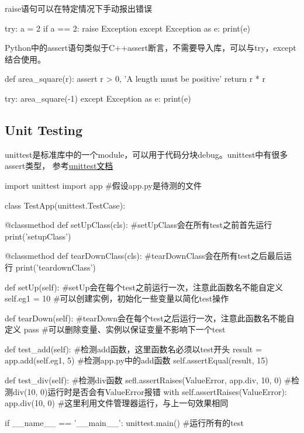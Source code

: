     raise语句可以在特定情况下手动报出错误
    \begin{codeblock}[language=python, caption={Raise an error}]
      try:
          a = 2
          if a == 2:
              raise Exception
      except Exception as e:
          print(e)
    \end{codeblock}

    Python中的assert语句类似于C++assert断言，不需要导入库，可以与try，except结合使用。
    \begin{codeblock}[language=python, caption={assert in python}]
      def area_square(r):
          assert r > 0, 'A length must be positive'
          return r * r

      try:
          area_square(-1)
      except Exception as e:
          print(e)
    \end{codeblock}

  \subsection{Unit Testing}
    unittest是标准库中的一个module，可以用于代码分块debug。unittest中有很多assert类型，
    参考\href{https://docs.python.org/3/library/unittest.html#module-unittest}{\underline{unittest文档}}
    \begin{codeblock}[language=python, caption={Unit Testing}]
      import unittest
      import app #假设app.py是待测的文件

      class TestApp(unittest.TestCase):

          @classmethod
          def setUpClass(cls): #setUpClass会在所有test之前首先运行
              print('setupClass')

          @classmethod
          def tearDownClass(cls): #tearDownClass会在所有test之后最后运行
              print('teardownClass')

          def setUp(self): #setUp会在每个test之前运行一次，注意此函数名不能自定义
              self.eg1 = 10 #可以创建实例，初始化一些变量以简化test操作

          def tearDown(self): #tearDown会在每个test之后运行一次，注意此函数名不能自定义
              pass #可以删除变量、实例以保证变量不影响下一个test

          def test_add(self): #检测add函数，这里函数名必须以test开头
              result = app.add(self.eg1, 5) #检测app.py中的add函数
              self.assertEqual(result, 15)

          def test_div(self): #检测div函数
              sefl.assertRaises(ValueError, app.div, 10, 0)
              #检测div(10, 0)运行时是否会有ValueError报错
              with self.assertRaises(ValueError):
                  app.div(10, 0) #这里利用文件管理器运行，与上一句效果相同

      if __name__ == '__main__':
          unittest.main() #运行所有的test
    \end{codeblock}

